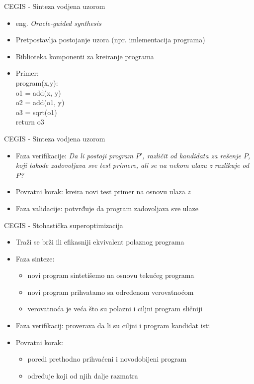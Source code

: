 
\begin{frame}{CEGIS - Sinteza vodjena uzorom}
    \begin{itemize}
        \item eng. \emph{Oracle-guided synthesis}
        \item Pretpostavlja postojanje uzora (npr. imlementacija programa)
        \item Biblioteka komponenti za kreiranje programa
		\item Primer:  \\
				program(x,y):\\
				o1 = add(x, y)\\
				o2 = add(o1, y)\\
				o3 = sqrt(o1)\\
				return o3\\
    \end{itemize}
\end{frame}


\begin{frame}{CEGIS - Sinteza vodjena uzorom}
    \begin{itemize}     
        \item Faza verifikacije: \emph{Da li postoji program $P'$, različit od kandidata za rešenje $P$, koji takođe zadovoljava sve test primere, ali se na nekom ulazu z razlikuje od $P$?} 
        \item Povratni korak: kreira novi test primer na osnovu ulaza $z$
        \item Faza validacije: potvrđuje da program zadovoljava sve ulaze
    \end{itemize}
\end{frame}


\begin{frame}{CEGIS - Stohastička superoptimizacija}
    \begin{itemize}
        \item Traži se brži ili efikasniji ekvivalent polaznog programa
        \item Faza sinteze:
        \begin{itemize}
        	\item novi program sintetišemo na osnovu tekućeg programa
        	\item novi program prihvatamo sa određenom verovatnoćom
        	\item verovatnoća je veća što su polazni i ciljni program sličniji
        \end{itemize}
        \item Faza verifikacij: proverava da li su ciljni i program kandidat isti
        \item Povratni korak: 
        \begin{itemize}
        	\item poredi prethodno prihvaćeni i novodobijeni program
        	\item određuje koji od njih dalje razmatra
        \end{itemize}
       
    \end{itemize}
\end{frame}

